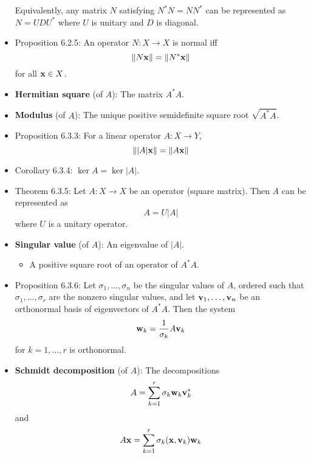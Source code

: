 \documentclass[../../notes.tex]{subfiles}
\begin{document}
\begin{itemize}
    Equivalently, any matrix $N$ satisfying $N^*N=NN^*$ can be represented as $N=UDU^*$ where $U$ is unitary and $D$ is diagonal.
    \item Proposition 6.2.5: An operator $N:X\to X$ is normal iff
    \begin{equation*}
        \norm{N\mathbf{x}} = \norm{N^*\mathbf{x}}
    \end{equation*}
    for all $\mathbf{x}\in X$.
    \item \textbf{Hermitian square} (of $A$): The matrix $A^*A$.
    \item \textbf{Modulus} (of $A$): The unique positive semidefinite square root $\sqrt{A^*A}$.
    \item Proposition 6.3.3: For a linear operator $A:X\to Y$,
    \begin{equation*}
        \norm{|A|\mathbf{x}} = \norm{A\mathbf{x}}
    \end{equation*}
    \item Corollary 6.3.4: $\ker A=\ker|A|$.
    \item Theorem 6.3.5: Let $A:X\to X$ be an operator (square matrix). Then $A$ can be represented as
    \begin{equation*}
        A = U|A|
    \end{equation*}
    where $U$ is a unitary operator.
    \item \textbf{Singular value} (of $A$): An eigenvalue of $|A|$.
    \begin{itemize}
        \item A positive square root of an operator of $A^*A$.
    \end{itemize}
    \item Proposition 6.3.6: Let $\sigma_1,\dots,\sigma_n$ be the singular values of $A$, ordered such that $\sigma_1,\dots,\sigma_r$ are the nonzero singular values, and let $\mathbf{v}_1,\dots,\mathbf{v}_n$ be an orthonormal basis of eigenvectors of $A^*A$. Then the system
    \begin{equation*}
        \mathbf{w}_k = \frac{1}{\sigma_k}A\mathbf{v}_k
    \end{equation*}
    for $k=1,\dots,r$ is orthonormal.
    \item \textbf{Schmidt decomposition} (of $A$): The decompositions
    \begin{equation*}
        A = \sum_{k=1}^r\sigma_k\mathbf{w}_k\mathbf{v}_k^*
    \end{equation*}
    and
    \begin{equation*}
        A\mathbf{x} = \sum_{k=1}^r\sigma_k(\mathbf{x},\mathbf{v}_k)\mathbf{w}_k
    \end{equation*}

\end{itemize}
\end{document}
